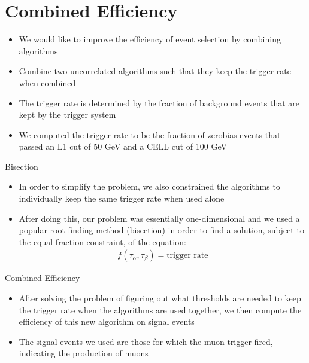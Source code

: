 \documentclass[]{beamer}
\begin{document}
\section{Combined Efficiency}
\begin{frame}
\begin{itemize}
        \item We would like to improve the efficiency of event selection by combining algorithms 
        \item Combine two uncorrelated algorithms such that they keep the trigger rate when combined 
		\item The trigger rate is determined by the fraction of background events that are kept by the trigger system
		\item We computed the trigger rate to be the fraction of zerobias events that passed an L1 cut of 50 GeV and a CELL cut of 100 GeV
\end{itemize}
\end{frame}
\begin{frame}{Bisection}
		\begin{itemize}
				\item In order to simplify the problem, we also constrained the algorithms to individually keep the same trigger rate when used alone
				\item After doing this, our problem was essentially one-dimensional and we used a popular root-finding method (bisection) in order to find a solution, subject to the equal fraction constraint, of the equation:
						\begin{align}
								f(\tau_{\alpha},\tau_{\beta})=\textrm{trigger rate}
						\end{align}
		\end{itemize}
\end{frame}
\begin{frame}
\end{frame}
\begin{frame}{Combined Efficiency}
		\begin{itemize}
				\item After solving the problem of figuring out what thresholds are needed to keep the trigger rate when the algorithms are used together, we then compute the efficiency of this new algorithm on signal events
				\item The signal events we used are those for which the muon trigger fired, indicating the production of muons
		\end{itemize}
\end{frame}
\end{document}
